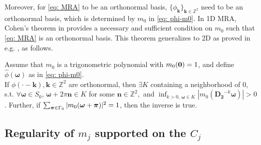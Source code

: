 Moreover, for  \eqref{eq: MRA} to be an orthonormal basis,  $\{\phi_{\boldsymbol{k}}\}_{\boldsymbol{k}\in\mathbb{Z}^2}$ need to be an orthonormal basis, which is determined by $m_0$ in \eqref{eq: phi-m0}. In 1D MRA, Cohen's theorem in \cite{cohen1992biorthogonal} provides a necessary and sufficient condition on $m_0$ such that \eqref{eq: MRA} is an orthonormal basis. %
This theorem generalizes to 2D as proved in  e.g. \cite{yin2014orthshear}, as follows.
\begin{thm}\label{thm: basis cond}
Assume that $m_0$ is a trigonometric polynomial with $m_0(\boldsymbol{0})=1$, and define $\hat{\phi}(\boldsymbol{\omega})$ as in \eqref{eq: phi-m0}.\\
If $\phi(\cdot - \boldsymbol{k}),\boldsymbol{k}\in\mathbb{Z}^2$ are orthonormal, then $\exists K$ containing a neighborhood of 0, s.t. $\forall\boldsymbol{\omega}\in S_0,\,\boldsymbol{\omega}+2\pi\mathbf{n}\in K$ for some $\mathbf{n}\in\mathbb{Z}^2, $ and $\inf_{k>0,\,\boldsymbol{\omega}\in K}|m_0(\mathbf{D_2}^{-k}\boldsymbol{\omega})| >0$. 
 Further, if $\sum_{\boldsymbol{\boldsymbol{\pi}}\in \Gamma_0} |m_0(\boldsymbol{\omega}+\boldsymbol{\pi})|^2 = 1$, then the inverse is true.
\end{thm}

\subsection{Regularity of $m_j$ supported on the $C_j$}\label{sec: design}

